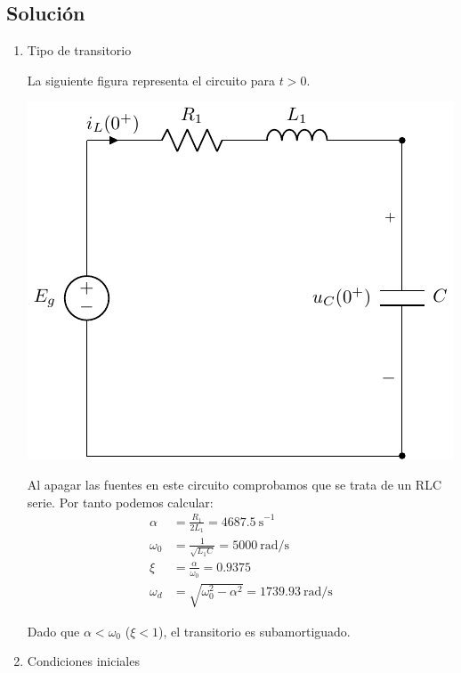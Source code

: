 \subsection*{Solución}

\begin{enumerate}

\item Tipo de transitorio

La siguiente figura representa el circuito para $t > 0$.

\includegraphics{figuras/E1_RLC_0+.pdf}

Al apagar las fuentes en este circuito comprobamos que se trata de un RLC serie. Por tanto podemos calcular:
\begin{align*}
  \alpha &= \frac{R_1}{2L_1} = \SI{4687.5}{\second}^{-1}\\[3pt]
  \omega_0 &= \frac{1}{\sqrt{L_1C}} = \SI{5000}{\radian\per\second}\\[3pt]
  \xi &= \frac{\alpha}{\omega_0} = 0.9375\\[3pt]
  \omega_d &= \sqrt{\omega_0^2 - \alpha^2} = \SI{1739.93}{\radian\per\second}
\end{align*}

\vspace{1mm}
Dado que $\alpha < \omega_0$ ($\xi < 1$), el transitorio es subamortiguado.

\vspace{2mm}

\item Condiciones iniciales


\end{enumerate}
